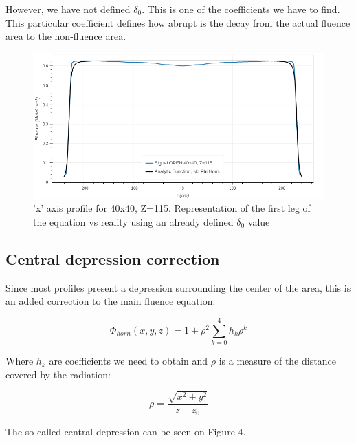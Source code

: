 \documentclass[openany]{article}
\begin{document}
However, we have not defined \(\delta_0\). This is one of the coefficients we have to find. This particular coefficient defines how abrupt is the decay from the actual fluence area to the non-fluence area.

\begin{figure}[!h]
    \centering
    \includegraphics[width=\textwidth]{NoCentralDepression.png}
    \caption{'x' axis profile for 40x40, Z=115. Representation of the first leg of the equation vs reality using an already defined \(\delta_0\) value}
    \label{fig:my_label}
\end{figure}

\subsection{Central depression correction}

Since most profiles present a depression surrounding the center of the area, this is an added correction to the main fluence equation.

\begin{equation}
    \Phi_{horn}(x,y,z) = 1+ \rho^2 \sum_{k=0}^4 h_k \rho^k
    
\end{equation}


Where \(h_k\) are coefficients we need to obtain and \(\rho\) is a measure of the distance covered by the radiation:

\begin{equation}
    \rho = \frac{\sqrt{x^2 + y^2}}{z-z_0}
\end{equation}


The so-called central depression can be seen on Figure 4.
\end{document}
